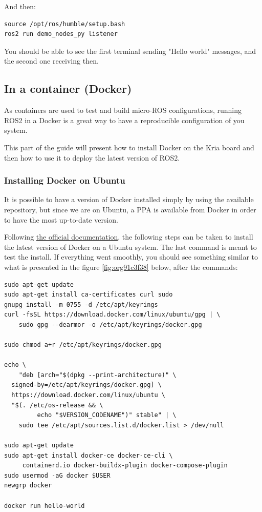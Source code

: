 \documentclass[10pt]{article}
\begin{document}
And then:
\begin{verbatim}
source /opt/ros/humble/setup.bash
ros2 run demo_nodes_py listener
\end{verbatim}

You should be able to see the first terminal sending "Hello world" messages,
and the second one receiving then.

\subsection{In a container (Docker)}
\label{sec:org365b915}
As containers are used to test and build micro-ROS configurations,
running ROS2 in a Docker  is a great way to have a reproducible configuration
of you system.

This part of the guide will present how to install Docker on the
Kria board and then how to use it to deploy the latest version of ROS2.

\subsubsection{Installing Docker on Ubuntu}
\label{sec:org076e980}
It is possible to have a version of Docker installed simply by using the available repository,
but since we are on Ubuntu, a PPA is available from Docker in order to have the most up-to-date version.

Following \href{https://docs.docker.com/engine/install/ubuntu/\#install-using-the-repository}{the official documentation}, the following steps can be taken to install the latest version of
Docker on a Ubuntu system. The last command is meant to test the install.
If everything went smoothly, you should see something similar to what is presented
in the figure \ref{fig:org91c3f38} below, after the commands:

\begin{verbatim}
sudo apt-get update
sudo apt-get install ca-certificates curl sudo
gnupg install -m 0755 -d /etc/apt/keyrings
curl -fsSL https://download.docker.com/linux/ubuntu/gpg | \
    sudo gpg --dearmor -o /etc/apt/keyrings/docker.gpg

sudo chmod a+r /etc/apt/keyrings/docker.gpg

echo \
    "deb [arch="$(dpkg --print-architecture)" \
  signed-by=/etc/apt/keyrings/docker.gpg] \
  https://download.docker.com/linux/ubuntu \
  "$(. /etc/os-release && \
         echo "$VERSION_CODENAME")" stable" | \
    sudo tee /etc/apt/sources.list.d/docker.list > /dev/null

sudo apt-get update
sudo apt-get install docker-ce docker-ce-cli \
     containerd.io docker-buildx-plugin docker-compose-plugin
sudo usermod -aG docker $USER
newgrp docker

docker run hello-world
\end{verbatim}
\end{document}
